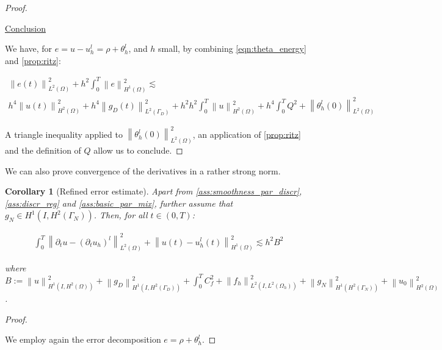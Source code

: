 \documentclass[english,a4paper,9pt,oneside]{scrbook}	%
\theoremstyle{break}
\newtheorem{cor}[equation]{Corollary}
\newenvironment{mproof}[1][\proofname]{%
  \begin{proof}[#1]$ $\par\nobreak\ignorespaces
}{%
  \end{proof}
}
\renewcommand*{\proofname}{Proof}
\theoremstyle{remark}
\newcommand{\ds}{\displaystyle}
\newcommand{\norm}[1]{\left\lVert#1\right\rVert}
\begin{document}
\begin{appendices}
\begin{mproof}
\underline{Conclusion}

We have, for $e=u-u_h^l = \rho + \theta_h^l$, and $h$ small, by combining \cref{eqn:theta_energy} and \cref{prop:ritz}:

\begin{align*}
	\norm{e(t)}_{L^2(\Omega)}^2 + h^2\int_0^T\norm{e}^2_{H^1(\Omega)} \lesssim \\
	 h^4 \norm{u(t)}_{H^2(\Omega)}^2 + h^4\norm{g_D(t)}_{L^2(\Gamma_D)}^2 + h^2h^2\int_0^T\norm{u}^2_{H^2(\Omega)} +  h^4\int_0^T Q^2 + \norm{\theta_h^l(0)}_{L^2(\Omega)}^2
\end{align*}

A triangle inequality applied to $\norm{\theta_h^l(0)}_{L^2(\Omega)}^2$, an application of \cref{prop:ritz} and the definition of $Q$ allow us to conclude.
\end{mproof}

We can also prove convergence of the derivatives in a rather strong norm.

\begin{cor}[Refined error estimate]
\label{cor:L2_deriv_est}
Apart from \cref{ass:smoothness_par_discr}, \cref{ass:discr_reg} and \cref{ass:basic_par_mix}, further assume that $g_{N}\in H^1(I, H^2(\Gamma_N))$. Then, for all $t \in (0,T)$:

\begin{align*}
	\int_0^T\norm{\partial_tu - (\partial_t u_h)^l}^2_{L^2(\Omega)} + \norm{u(t)-u_h^l(t)}_{H^1(\Omega)}^2 \lesssim h^2 B^2
\end{align*}


where $B:=\ds \norm{u}_{H^1(I,H^2(\Omega))}^2 + \norm{g_D}_{H^1(I,H^2(\Gamma_D))}^2 +  \int_0^T C_f^2+  \norm{f_h}_{L^2(I,L^2(\Omega_h))}^2 +\norm{g_N}_{H^1(H^2(\Gamma_N))}^2+\norm{u_0}_{H^2(\Omega)}^2$.

\end{cor}

\begin{mproof}

We employ again the error decomposition $e = \rho + \theta_h^l$.

%
%
%


\end{mproof}
\end{appendices}
\end{document}
